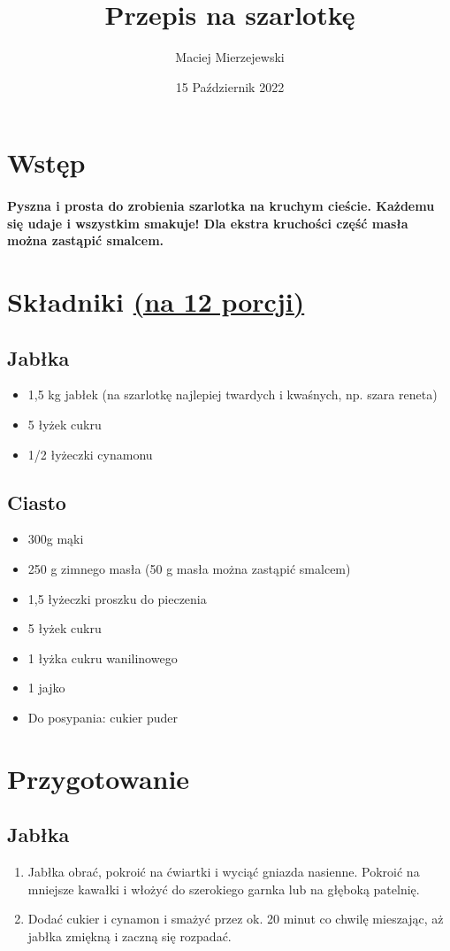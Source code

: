 \documentclass[11pt, a4paper, titlepage]{article}
\title{Przepis na szarlotkę}
\author{Maciej Mierzejewski}
\date{15 Październik 2022}
\begin{document}
\maketitle

\section{Wstęp}
\paragraph{Pyszna i prosta do zrobienia szarlotka na kruchym cieście. Każdemu się udaje i wszystkim smakuje! Dla ekstra kruchości część masła można zastąpić smalcem.}

\section{Składniki \underline{(na 12 porcji)}}
\subsection{Jabłka}
\begin{itemize}
\item 1,5 kg jabłek (na szarlotkę najlepiej twardych i kwaśnych, np. szara reneta)
\item 5 łyżek cukru
\item 1/2 łyżeczki cynamonu
\end{itemize}

\subsection{Ciasto}
\begin{itemize}
\item 300g mąki
\item 250 g zimnego masła (50 g masła można zastąpić smalcem)
\item 1,5 łyżeczki proszku do pieczenia
\item 5 łyżek cukru
\item 1 łyżka cukru wanilinowego
\item 1 jajko
\item Do posypania: cukier puder
\end{itemize}

\section{Przygotowanie}
\subsection{Jabłka}
\begin{enumerate}
\item Jabłka obrać, pokroić na ćwiartki i wyciąć gniazda nasienne. Pokroić na mniejsze kawałki i włożyć do szerokiego garnka lub na głęboką patelnię.
\item Dodać cukier i cynamon i smażyć przez ok. 20 minut co chwilę mieszając, aż jabłka zmiękną i zaczną się rozpadać.
\end{enumerate}
\end{document}
